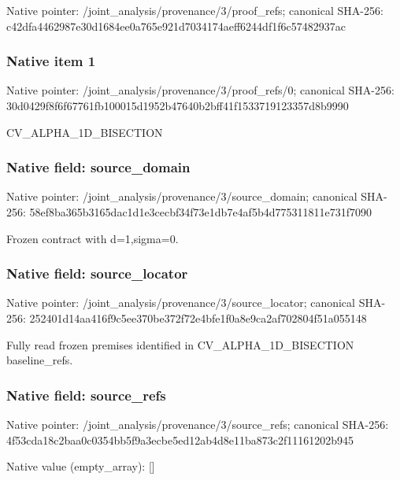 \documentclass[10pt,a4paper]{article}
\begin{document}
Native pointer: /joint\_analysis/provenance/3/proof\_refs; canonical SHA-256: c42dfa4462987e30d1684ee0\allowbreak{}a765e921d7034174aeff6244\allowbreak{}df1f6c57482937ac



\subsubsection{Native item 1}


Native pointer: /joint\_analysis/provenan\allowbreak{}ce/3/proof\_refs/0; canonical SHA-256: 30d0429f8f6f67761fb10001\allowbreak{}5d1952b47640b2bff41f1533\allowbreak{}719123357d8b9990


CV\_ALPHA\_1D\_BISECTION


\subsubsection{Native field: source\_domain}


Native pointer: /joint\_analysis/provenan\allowbreak{}ce/3/source\_domain; canonical SHA-256: 58ef8ba365b3165dac1d1e3c\allowbreak{}ecbf34f73e1db7e4af5b4d77\allowbreak{}5311811e731f7090


Frozen contract with d=1,sigma=0.


\subsubsection{Native field: source\_locator}


Native pointer: /joint\_analysis/provenan\allowbreak{}ce/3/source\_locator; canonical SHA-256: 252401d14aa416f9c5ee370b\allowbreak{}e372f72e4bfe1f0a8e9ca2af\allowbreak{}702804f51a055148


Fully read frozen premises identified in CV\_ALPHA\_1D\_BISECTION baseline\_refs.


\subsubsection{Native field: source\_refs}


Native pointer: /joint\_analysis/provenan\allowbreak{}ce/3/source\_refs; canonical SHA-256: 4f53cda18c2baa0c0354bb5f\allowbreak{}9a3ecbe5ed12ab4d8e11ba87\allowbreak{}3c2f11161202b945



Native value (empty\_array): []
\end{document}
